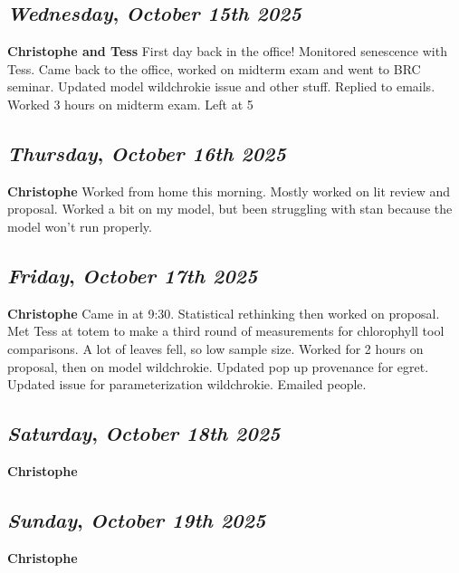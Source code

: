 \begin{center}
\section*{\month}
\end{center}

\def\day{\textit{October 15th 2025}}
\def\weekday{\textit{Wednesday}}
\subsection*{\weekday, \day}
\textbf {Christophe and Tess}
First day back in the office! Monitored senescence with Tess. Came back to the office, worked on midterm exam and went to BRC seminar. Updated model wildchrokie issue and other stuff. Replied to emails. Worked 3 hours on midterm exam. Left at 5

\def\day{\textit{October 16th 2025}}
\def\weekday{\textit{Thursday}}
\subsection*{\weekday, \day}
\textbf {Christophe}
Worked from home this morning. Mostly worked on lit review and proposal. Worked a bit on my model, but been struggling with stan because the model won't run properly.

\def\day{\textit{October 17th 2025}}
\def\weekday{\textit{Friday}}
\subsection*{\weekday, \day}
\textbf {Christophe}
Came in at 9:30. Statistical rethinking then worked on proposal. Met Tess at totem to make a third round of measurements for chlorophyll tool comparisons. A lot of leaves fell, so low sample size. Worked for 2 hours on proposal, then on model wildchrokie. Updated pop up provenance for egret. Updated issue for parameterization wildchrokie. Emailed people.

\def\day{\textit{October 18th 2025}}
\def\weekday{\textit{Saturday}}
\subsection*{\weekday, \day}
\textbf {Christophe}

\def\day{\textit{October 19th 2025}}
\def\weekday{\textit{Sunday}}
\subsection*{\weekday, \day}
\textbf {Christophe}

